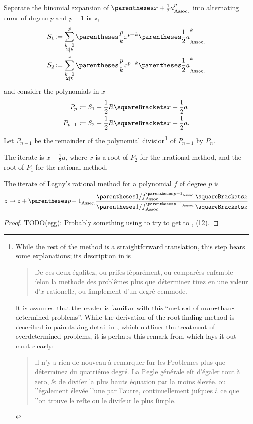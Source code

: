 ﻿\documentclass[10pt, a4paper, twoside]{basestyle}
\begin{document}
Separate the binomial expansion of $\pa{x+\frac{1}{2}a}^p$ into alternating sums of
degree $p$ and $p-1$ in $z$,\begin{align*}
S_1&\DefineAs\sum{\substack{k=0\\2\Divides k}}[p]\binom{p}{k}x^{p-k}\pa{\frac{1}{2}a}^k\\
S_2&\DefineAs\sum{\substack{k=0\\2\DoesNotDivide k}}[p]\binom{p}{k}x^{p-k}\pa{\frac{1}{2}a}^k
\end{align*}
and consider the polynomials in $x$\begin{align*}
P_{p}&\DefineAs S_1-\frac{1}{2}R\of{x+\frac{1}{2}a}\\
P_{p-1}&\DefineAs S_2-\frac{1}{2}R\of{x+\frac{1}{2}a}\text.
\end{align*}
Let $P_{n-1}$ be the remainder of the polynomial
division\footnote{While the rest of the method is a straightforward translation, this step bears some explanations; its description in \cite{FantetdeLagny1692} is
\begin{quote}\textfrench{De ces deux égalitez, ou priſes ſéparément, ou comparées enſemble ſelon la methode des problêmes plus que déterminez tirez en une valeur d'$x$ rationelle, ou ſimplement d'un degré commode.}
\end{quote}
It is assumed that the reader is familiar with this ``method of more-than-determined problems''.
While the derivation of the root-finding method is described in painstaking detail in \cite{FantetdeLagny1733},
which outlines the treatment of overdetermined problems, it is perhaps this remark from \cite[494]{FantetdeLagny1697} which lays it out most clearly:
\begin{quote}\textfrench{Il n'y a rien de nouveau à remarquer ſur les Problemes plus que déterminez du quatriéme degré. La Regle générale eſt d'égaler tout à zero, \& de diviſer la plus haute équation par la moins élevée, ou l'également élevée l'une par l'autre, continuellement juſques à ce que l'on trouve le reſte ou le diviſeur le plus ſimple.}
\end{quote}}
of $P_{n+1}$ by $P_{n}$.

The iterate is $x+\frac{1}{2}a$, where $x$ is a root of $P_{2}$ for the irrational method,
and the root of $P_{1}$ for the rational method.

\begin{theorem}
The iterate of Lagny’s rational method for a polynomial $f$ of degree $p$ is\begin{equation}
z\mapsto z + \pa{p-1}\frac{\pa{1/f}^{\pa{p-2}}\of{z}}{\pa{1/f}^{\pa{p-1}}\of{z}}\label{LagnyRationalIterate}
\end{equation}
\begin{proof}
TODO(egg): Probably something using \cite[52--54]{Householder1970} to try to get to \cite[169]{Householder1970}, (12).
\end{proof}
\end{theorem}
\end{document}
